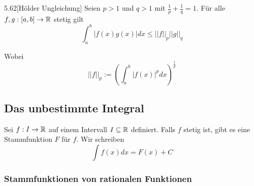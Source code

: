\begin{satz}{5.62}[Hölder Ungleichung]
    Seien $p > 1$ und $q > 1$ mit $\frac{1}{p} + \frac{1}{q} = 1$.
    Für alle $f, g: [a,b] \to \mathbb{R}$ stetig gilt
    \[ \int_a^b |f(x)g(x)|dx \le ||f||_p||g||_q \]

    Wobei
    \[ ||f||_p := \left( \int_a^b |f(x)|^p dx \right)^{\frac{1}{p}} \]
\end{satz}

\subsection{Das unbestimmte Integral}

Sei $f: I \to \mathbb{R}$ auf einem Intervall $I \subseteq \mathbb{R}$ definiert. Falls $f$ stetig ist, gibt es eine Stammfunktion $F$ für $f$. Wir schreiben
\[ \int f(x)dx = F(x) + C \]

\subsubsection{Stammfunktionen von rationalen Funktionen}


